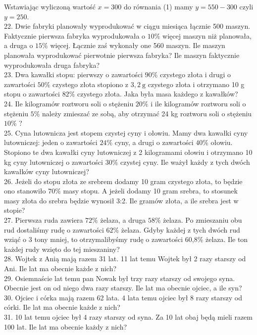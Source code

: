 \documentclass[10pt]{article}
\begin{document}
Wstawiając wyliczoną wartość \(x=300\) do równania (1) mamy \(y=550-300\) czyli \(y=250\).\\
22. Dwie fabryki planowały wyprodukować w ciągu miesiąca łącznie 500 maszyn. Faktycznie pierwsza fabryka wyprodukowała o \(10 \%\) więcej maszyn niż planowała, a druga o \(15 \%\) więcej. Łącznie zaś wykonały one 560 maszyn. Ile maszyn planowała wyprodukować pierwotnie pierwsza fabryka? Ile maszyn faktycznie wyprodukowała druga fabryka?\\
23. Dwa kawałki stopu: pierwszy o zawartości \(90 \%\) czystego złota i drugi o zawartości \(50 \%\) czystego złota stopiono z \(3,2 \mathrm{~g}\) czystego złota i otrzymano 10 g stopu o zawartości \(82 \%\) czystego złota. Jaka była masa każdego z kawałków?\\
24. Ile kilogramów roztworu soli o stężeniu \(20 \%\) i ile kilogramów roztworu soli o stężeniu \(5 \%\) należy zmieszać ze sobą, aby otrzymać 24 kg roztworu soli o stężeniu \(10 \%\) ?\\
25. Cyna lutownicza jest stopem czystej cyny i ołowiu. Mamy dwa kawałki cyny lutowniczej: jeden o zawartości \(24 \%\) cyny, a drugi o zawartości \(40 \%\) ołowiu. Stopiono te dwa kawałki cyny lutowniczej z 2 kilogramami ołowiu i otrzymano 10 kg cyny lutowniczej o zawartości \(30 \%\) czystej cyny. Ile ważył każdy z tych dwóch kawałków cyny lutowniczej?\\
26. Jeżeli do stopu złota ze srebrem dodamy 10 gram czystego złota, to będzie ono stanowiło \(70 \%\) masy stopu. A jeżeli dodamy 10 gram srebra, to stosunek masy złota do srebra będzie wynosił 3:2. Ile gramów złota, a ile srebra jest w stopie?\\
27. Pierwsza ruda zawiera \(72 \%\) żelaza, a druga \(58 \%\) żelaza. Po zmieszaniu obu rud dostaliśmy rudę o zawartości \(62 \%\) żelaza. Gdyby każdej z tych dwóch rud wziąć o 3 tony mniej, to otrzymalibyśmy rudę o zawartości 60,8\% żelaza. Ile ton każdej rudy wzięto do tej mieszaniny?\\
28. Wojtek z Anią mają razem 31 lat. 11 lat temu Wojtek był 2 razy starszy od Ani. Ile lat ma obecnie każde z nich?\\
29. Osiemnaście lat temu pan Nowak był trzy razy starszy od swojego syna. Obecnie jest on od niego dwa razy starszy. Ile lat ma obecnie ojciec, a ile syn?\\
30. Ojciec i córka mają razem 62 lata. 4 lata temu ojciec był 8 razy starszy od córki. Ile lat ma obecnie każde z nich?\\
31. 10 lat temu ojciec był 4 razy starszy od syna. Za 10 lat obaj będą mieli razem 100 lat. Ile lat ma obecnie każdy z nich?\\
\end{document}
